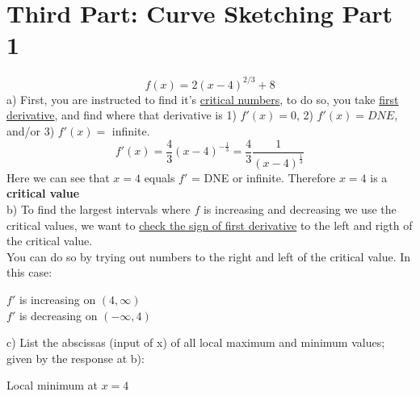 \documentclass[12pt, letterpaper]{article}
\begin{document}
\section{Third Part: Curve Sketching Part 1}
\[f(x)=2(x-4)^{2/3}+8\]
a) First, you are instructed to find it's \underline{critical numbers}, to do so, you take \underline{first derivative}, and find where that derivative is 1) \(f'(x)=0\), 2) \(f'(x)=DNE\), and/or 3) \(f'(x)=\) infinite.
\[f'(x)=\frac{4}{3}(x-4)^{-\frac{1}{3}} = \frac{4}{3} \frac{1}{(x-4)^\frac{1}{3}}\]
Here we can see that \(x=4\) equals \(f'\) = DNE or infinite. Therefore \(x=4\) is a \textbf{critical value}\\
\newline
b) To find the largest intervals where \(f\) is increasing and decreasing we use the critical values, we want to \underline{check the sign of first derivative} to the left and rigth of the critical value.\\
\newline
You can do so by trying out numbers to the right and left of the critical value. In this case:
\begin{center}
    \(f'\) is increasing on \((4,\infty)\)\\
    \(f'\) is decreasing on \((-\infty, 4)\)
\end{center}
c) List the abscissas (input of x) of all local maximum and minimum values; given by the response at b):
\begin{center}
    Local minimum at \(x=4\)
\end{center}
\end{document}
